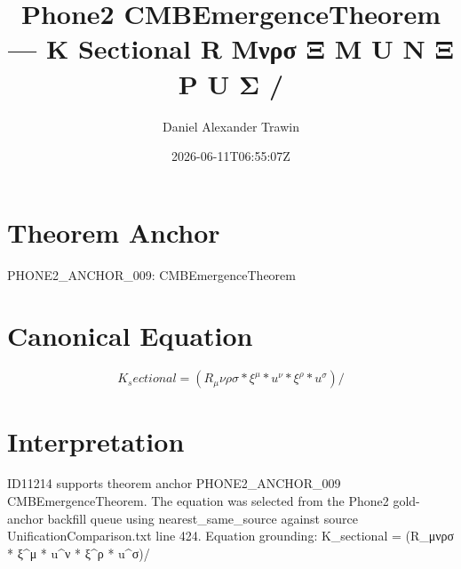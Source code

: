 \documentclass[11pt]{article}
\title{Phone2 CMBEmergenceTheorem — K Sectional R Μνρσ Ξ Μ U Ν Ξ Ρ U Σ /}
\author{Daniel Alexander Trawin}
\date{2026-06-11T06:55:07Z}
\begin{document}
\maketitle
\section*{Theorem Anchor}
PHONE2_ANCHOR_009: CMBEmergenceTheorem
\section*{Canonical Equation}
\[
K_sectional = (R_μνρσ * ξ^μ * u^ν * ξ^ρ * u^σ)/
\]
\section*{Interpretation}
ID11214 supports theorem anchor PHONE2_ANCHOR_009 CMBEmergenceTheorem. The equation was selected from the Phone2 gold-anchor backfill queue using nearest_same_source against source UnificationComparison.txt line 424. Equation grounding: K_sectional = (R_μνρσ * ξ^μ * u^ν * ξ^ρ * u^σ)/
\end{document}
